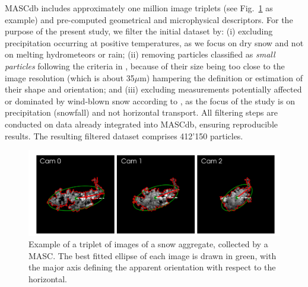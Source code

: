 \documentclass[draft]{agujournal2019}
\begin{document}
MASCdb includes approximately one million image triplets (see Fig.~\ref{fig:triplet} as example) and pre-computed geometrical and microphysical descriptors. For the purpose of the present study, we filter the initial dataset by: (i) excluding precipitation occurring at positive temperatures, as we focus on dry snow and not on melting hydrometeors or rain; (ii) removing particles classified as \textit{small particles} following the criteria in \cite{Praz_AMT_2017}, because of their size being too close to the image resolution (which is about 35$\mu$m) hampering the definition or estimation of their shape and orientation; and (iii) excluding measurements potentially affected or dominated by wind-blown snow according to \cite{Schaer_TC_2020}, as the focus of the study is on precipitation (snowfall) and not horizontal transport. All filtering steps are conducted on data already integrated into MASCdb, ensuring reproducible results. The resulting filtered dataset comprises 412'150 particles.

\begin{figure}
 \noindent\includegraphics[width=\textwidth]{Fig01.png}
\caption{Example of a triplet of images of a snow aggregate, collected by a MASC. The best fitted ellipse of each image is drawn in green, with the major axis defining the apparent orientation with respect to the horizontal.    }
\label{fig:triplet}
\end{figure}
\end{document}
